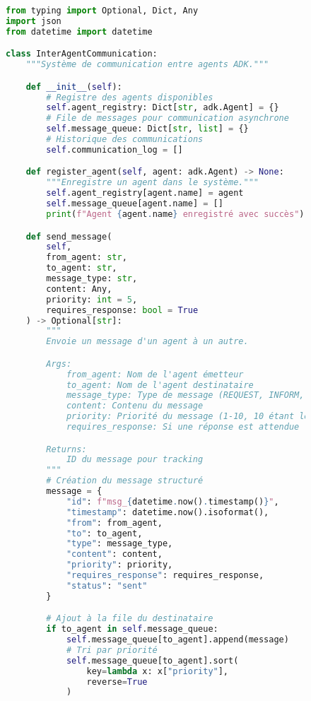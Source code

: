 \begin{figure}[H]
\centering
\begin{lstlisting}[language=Python, caption=Architecture de communication inter-agents]
from typing import Optional, Dict, Any
import json
from datetime import datetime

class InterAgentCommunication:
    """Système de communication entre agents ADK."""

    def __init__(self):
        # Registre des agents disponibles
        self.agent_registry: Dict[str, adk.Agent] = {}
        # File de messages pour communication asynchrone
        self.message_queue: Dict[str, list] = {}
        # Historique des communications
        self.communication_log = []

    def register_agent(self, agent: adk.Agent) -> None:
        """Enregistre un agent dans le système."""
        self.agent_registry[agent.name] = agent
        self.message_queue[agent.name] = []
        print(f"Agent {agent.name} enregistré avec succès")

    def send_message(
        self,
        from_agent: str,
        to_agent: str,
        message_type: str,
        content: Any,
        priority: int = 5,
        requires_response: bool = True
    ) -> Optional[str]:
        """
        Envoie un message d'un agent à un autre.

        Args:
            from_agent: Nom de l'agent émetteur
            to_agent: Nom de l'agent destinataire
            message_type: Type de message (REQUEST, INFORM, QUERY, etc.)
            content: Contenu du message
            priority: Priorité du message (1-10, 10 étant le plus urgent)
            requires_response: Si une réponse est attendue

        Returns:
            ID du message pour tracking
        """
        # Création du message structuré
        message = {
            "id": f"msg_{datetime.now().timestamp()}",
            "timestamp": datetime.now().isoformat(),
            "from": from_agent,
            "to": to_agent,
            "type": message_type,
            "content": content,
            "priority": priority,
            "requires_response": requires_response,
            "status": "sent"
        }

        # Ajout à la file du destinataire
        if to_agent in self.message_queue:
            self.message_queue[to_agent].append(message)
            # Tri par priorité
            self.message_queue[to_agent].sort(
                key=lambda x: x["priority"],
                reverse=True
            )


\end{lstlisting}
\end{figure}
